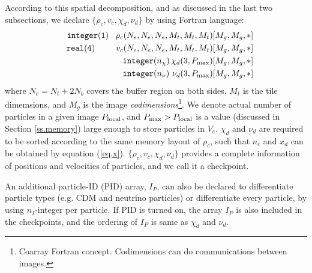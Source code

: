 \documentclass[10pt,twocolumn,preprint]{emulateapj}
\begin{document}
According to this spatial decomposition, and as discussed in the last two subsections, we declare $\{\rho_c,v_c,\chi_d,\nu_d\}$ by using Fortran language:
\begin{eqnarray*}
	&&{\tt integer(1)}\ \ \, \rho_c(N_e,N_e,N_e,M_t,M_t,M_t)[M_g,M_g,*]\\
	&&{\tt real(4)}\ \ \ \ \ \ \ \, v_c(N_e,N_e,N_e,M_t,M_t,M_t)[M_g,M_g,*]\\
	&&{\tt integer(}n_\chi{\tt )}\, \chi_d(3,P_{\rm max})[M_g,M_g,*]\\
	&&{\tt integer(}n_\nu{\tt )}\ \nu_d(3,P_{\rm max})[M_g,M_g,*]
\end{eqnarray*}
where $N_e=N_t+2N_b$ covers the buffer region on both sides, $M_t$ is the tile dimemsions, and $M_g$ is the image {\it codimensions}\footnote{Coarray Fortran concept. Codimensions can do communications between images.}. We denote actual number of particles in a given image $P_{\rm local}$, and $P_{\rm max}>P_{\rm local}$ is a value (discussed in Section \ref{ss.memory}) large enough to store particles in $V_e$. $\chi_d$ and $\nu_d$
are required to be sorted according to the same memory layout of $\rho_c$, such that $n_c$ and $x_d$ can be obtained by equation (\ref{eq.x}). 
$\{\rho_c,v_c,\chi_d,\nu_d\}$ provides a complete information of positions and velocities of particles, and we call it a checkpoint.

An additional particle-ID (PID) array, $I_P$, can also be declared to differentiate particle types (e.g. CDM and neutrino particles) or differentiate every particle, by using $n_I$-integer per particle. If PID is turned on, the array $I_P$ is also included in the checkpoints, and the ordering of $I_P$ is same as $\chi_d$ and $\nu_d$.
\end{document}
